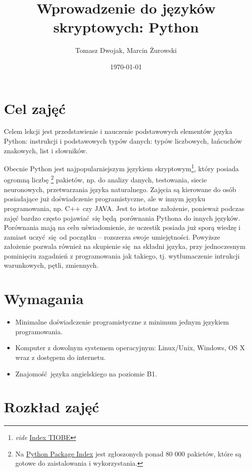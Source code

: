 \documentclass{mwart}
\author{Tomasz Dwojak, Marcin Żurowski}
\title{Wprowadzenie do języków skryptowych: Python}
\date{\today}
\begin{document}
\maketitle

\section{Cel zajęć}
Celem lekcji jest przedstawienie i nauczenie podstawowych elementów języka Python:
instrukcji i podstawowych typów danych: typów liczbowych, łańcuchów znakowych, list i
słowników.

Obecnie Python jest najpopularniejszym językiem skryptowym\footnote{\emph{vide}
  \href{http://www.tiobe.com/tiobe_index}{Index TIOBE}}, który posiada
ogromną liczbę \footnote{Na \href{https://pypi.python.org/pypi}{Python Package Index} jest
  zgłoszonych ponad 80 000 pakietów, które są gotowe do zaistalowania i wykorzystania.} pakietów, np. do
analizy danych, testowania, siecie neuronowych, przetwarzania języka naturalnego.
Zajęcia są kierowane do osób posiadające już doświadczenie programistyczne, ale w innym
języku programowania, np. C++ czy JAVA. Jest to istotne założenie, ponieważ podczas zajęć bardzo
często pojawiać się będą porównania Pythona do innych języków. Porównania mają na celu
uświadomienie, że uczestik posiada już sporą wiedzę i zamiast uczyć się od początku --
rozszerza swoje umiejętności. Powyższe założenie
pozwala również na skupienie się na składni języka, przy jednoczesnym pominięciu zagadnień z
programowania jak takiego, tj. wytłumaczenie intrukcji warunkowych, pętli, zmiennych.

\section{Wymagania}
\begin{itemize}
  \item Minimalne doświadczenie programistyczne z minimum jednym językiem programowania.
  \item Komputer z dowolnym systemem operacyjnym: Linux/Unix, Windows, OS X wraz z
    dostępem do internetu.
  \item Znajomość języka angielskiego na poziomie B1.
\end{itemize}

\section{Rozkład zajęć}
\end{document}
